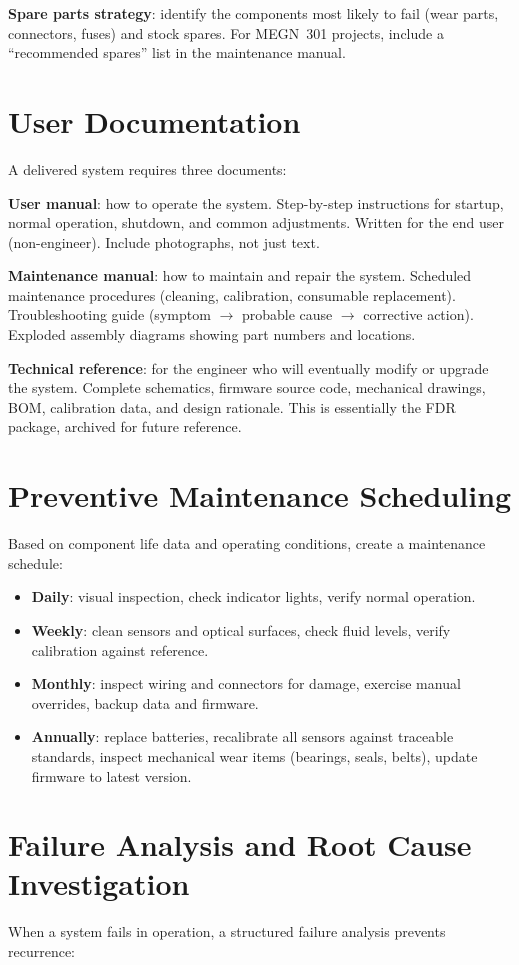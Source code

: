 \textbf{Spare parts strategy}: identify the components most likely to fail (wear parts, connectors, fuses) and stock spares. For MEGN~301 projects, include a ``recommended spares'' list in the maintenance manual.

\section{User Documentation}
A delivered system requires three documents:

\textbf{User manual}: how to operate the system. Step-by-step instructions for startup, normal operation, shutdown, and common adjustments. Written for the end user (non-engineer). Include photographs, not just text.

\textbf{Maintenance manual}: how to maintain and repair the system. Scheduled maintenance procedures (cleaning, calibration, consumable replacement). Troubleshooting guide (symptom $\to$ probable cause $\to$ corrective action). Exploded assembly diagrams showing part numbers and locations.

\textbf{Technical reference}: for the engineer who will eventually modify or upgrade the system. Complete schematics, firmware source code, mechanical drawings, BOM, calibration data, and design rationale. This is essentially the FDR package, archived for future reference.

\section{Preventive Maintenance Scheduling}
Based on component life data and operating conditions, create a maintenance schedule:

\begin{itemize}[nosep,leftmargin=1.5em]
\item \textbf{Daily}: visual inspection, check indicator lights, verify normal operation.
\item \textbf{Weekly}: clean sensors and optical surfaces, check fluid levels, verify calibration against reference.
\item \textbf{Monthly}: inspect wiring and connectors for damage, exercise manual overrides, backup data and firmware.
\item \textbf{Annually}: replace batteries, recalibrate all sensors against traceable standards, inspect mechanical wear items (bearings, seals, belts), update firmware to latest version.
\end{itemize}
\section{Failure Analysis and Root Cause Investigation}
When a system fails in operation, a structured failure analysis prevents recurrence:

